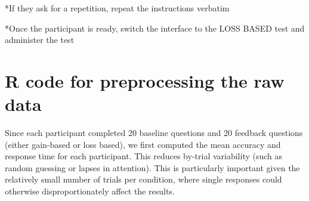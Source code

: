 \documentclass[12pt]{exam}
\begin{document}
*If they ask for a repetition, repeat the instructions verbatim

*Once the participant is ready, switch the interface to the LOSS BASED test and administer the test

\section{R code for preprocessing the raw data}
\label{appdx:r-preprocessing}
Since each participant completed 20 baseline questions and 20 feedback questions (either gain-based or loss based), we first computed the mean accuracy and response time for each participant. This reduces by-trial variability (such as random guessing or lapses in attention). This is particularly important given the relatively small number of trials per condition, where single responses could otherwise disproportionately affect the results.

\end{document}
